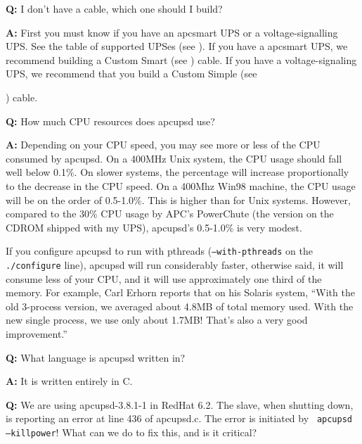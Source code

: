 \begin{description}
\item {\bf Q:}
I don't have a cable, which one should I build?  

\item {\bf A:}
First you must know if you have an apcsmart UPS or a voltage-signalling UPS.
See the table of supported UPSes (see 
). If you have a apcsmart UPS,
we recommend building a Custom Smart (see 
) cable. If you
have a voltage-signaling UPS, we recommend that you build a Custom Simple (see

)
cable.  

\item {\bf Q:}
How much CPU resources does apcupsd use?  

\item {\bf A:}
Depending on your CPU speed, you may see more or less of the CPU consumed by
apcupsd. On a 400MHz Unix system, the CPU usage should fall well below 0.1\%.
On slower systems, the percentage will increase proportionally to the decrease
in the CPU speed. On a 400Mhz Win98 machine, the CPU usage will be on the
order of 0.5-1.0\%. This is higher than for Unix systems. However, compared to
the 30\% CPU usage by APC's PowerChute (the version on the CDROM shipped with
my UPS), apcupsd's 0.5-1.0\% is very modest.  

If you configure apcupsd to run with pthreads ({\tt --with-pthreads} on the
{\tt ./configure} line), apcupsd will run considerably faster, otherwise said,
it will consume less of your CPU, and it will use approximately one third of
the memory. For example, Carl Erhorn reports that on his Solaris system,
``With the old 3-process version, we averaged about 4.8MB of total memory
used. With the new single process, we use only about 1.7MB! That's also a very
good improvement.''  

\item {\bf Q:}
What language is apcupsd written in?  

\item {\bf A:}
It is written entirely in C.  

\item {\bf Q:}
We are using apcupsd-3.8.1-1 in RedHat 6.2. The slave, when shutting down, is
reporting an error at line 436 of apcupsd.c. The error is initiated by {\tt
apcupsd --killpower}! What can we do to fix this, and is it critical?  


\end{description}
